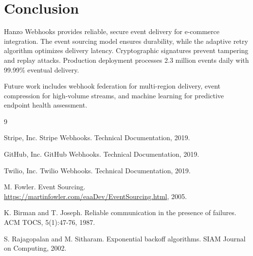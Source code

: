 \section{Conclusion}


Hanzo Webhooks provides reliable, secure event delivery for e-commerce integration. The event sourcing model ensures durability, while the adaptive retry algorithm optimizes delivery latency. Cryptographic signatures prevent tampering and replay attacks. Production deployment processes 2.3 million events daily with 99.99\% eventual delivery.

Future work includes webhook federation for multi-region delivery, event compression for high-volume streams, and machine learning for predictive endpoint health assessment.


\begin{thebibliography}{9}

Stripe, Inc. Stripe Webhooks. Technical Documentation, 2019.

GitHub, Inc. GitHub Webhooks. Technical Documentation, 2019.

Twilio, Inc. Twilio Webhooks. Technical Documentation, 2019.

M. Fowler. Event Sourcing. \url{https://martinfowler.com/eaaDev/EventSourcing.html}, 2005.

K. Birman and T. Joseph. Reliable communication in the presence of failures. ACM TOCS, 5(1):47-76, 1987.

S. Rajagopalan and M. Sitharam. Exponential backoff algorithms. SIAM Journal on Computing, 2002.

\end{thebibliography}

